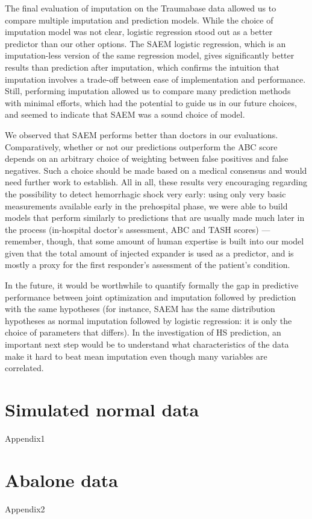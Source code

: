 \documentclass[12pt, a4paper]{memoir}
\begin{document}
The final evaluation of imputation on the Traumabase data allowed us to compare multiple imputation and prediction models. While the choice of imputation model was not clear, logistic regression stood out as a better predictor than our other options. The SAEM logistic regression, which is an imputation-less version of the same regression model, gives significantly better results than prediction after imputation, which confirms the intuition that imputation involves a trade-off between ease of implementation and performance. Still, performing imputation allowed us to compare many prediction methods with minimal efforts, which had the potential to guide us in our future choices, and seemed to indicate that SAEM was a sound choice of model.

We observed that SAEM performs better than doctors in our evaluations. Comparatively, whether or not our predictions outperform the ABC score depends on an arbitrary choice of weighting between false positives and false negatives. Such a choice should be made based on a medical consensus and would need further work to establish. All in all, these results very encouraging regarding the possibility to detect hemorrhagic shock very early: using only very basic measurements available early in the prehospital phase, we were able to build models that perform similarly to predictions that are usually made much later in the process (in-hospital doctor's assessment, ABC and TASH scores) --- remember, though, that some amount of human expertise is built into our model given that the total amount of injected expander is used as a predictor, and is mostly a proxy for the first responder's assessment of the patient's condition. 

In the future, it would be worthwhile to quantify formally the gap in predictive performance between joint optimization and imputation followed by prediction with the same hypotheses (for instance, SAEM has the same distribution hypotheses as normal imputation followed by logistic regression: it is only the choice of parameters that differs). In the investigation of HS prediction, an important next step would be to understand what characteristics of the data make it hard to beat mean imputation even though many variables are correlated.
\begin{appendices}
\chapter{Simulated normal data}
\label{simulation}
{Appendix1}

\chapter{Abalone data}
\label{abalone}
{Appendix2}
\end{appendices}


\end{document}
